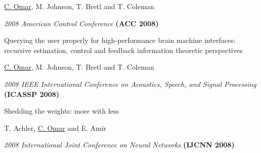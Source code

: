 \documentclass[10pt,letterpaper]{article}
\renewenvironment{itemize}{
  \begin{list}{}{
    \setlength{\leftmargin}{1.25em}
    \setlength{\itemsep}{0.25em}
    \setlength{\parskip}{0pt}
    \setlength{\parsep}{0.2em}
  }
}{
  \end{list}
}
\begin{document}
\begin{enumerate}[resume]
  \begin{itemize}
    \item \underline{C. Omar}, M. Johnson, T. Bretl and T. Coleman
    \item \textit{2008 American Control Conference} {\textbf{(ACC 2008)}}
  \end{itemize}
\item Querying the user properly for high-performance brain machine interfaces: recursive estimation, control and feedback information theoretic perspectives
  \begin{itemize}
    \item \underline{C. Omar}, M. Johnson, T. Bretl and T. Coleman
    \item \textit{2008 IEEE International Conference on Acoustics, Speech, and Signal Processing} {\textbf{(ICASSP 2008)}}
  \end{itemize}
\item Shedding the weights: more with less
  \begin{itemize}
    \item T. Achler, \underline{C. Omar} and E. Amir
    \item \textit{2008 International Joint Conference on Neural Networks} {\textbf{(IJCNN 2008)}}
  \end{itemize}
\end{enumerate}

\end{document}
